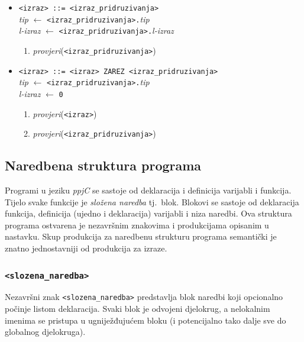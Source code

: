 \documentclass[times, 12pt, utf8]{book}
\begin{document}
\begin{itemize}

\item
\verb|<izraz> ::= <izraz_pridruzivanja>|\\
\emph{tip} \(\leftarrow\) \verb|<izraz_pridruzivanja>.|\emph{tip}\\
\emph{l-izraz} \(\leftarrow\) \verb|<izraz_pridruzivanja>.|\emph{l-izraz}
\begin{enumerate}
\item
\emph{provjeri}(\verb|<izraz_pridruzivanja>|)
\end{enumerate}

\item
\verb#<izraz> ::= <izraz> ZAREZ <izraz_pridruzivanja>#\\
\emph{tip} \(\leftarrow\) \verb|<izraz_pridruzivanja>.|\emph{tip}\\
\emph{l-izraz} \(\leftarrow\) \verb|0|
\begin{enumerate}
\item
\emph{provjeri}(\verb|<izraz>|)
\item
\emph{provjeri}(\verb|<izraz_pridruzivanja>|)
\end{enumerate}

\end{itemize}

\subsection{Naredbena struktura programa}
Programi u jeziku \emph{ppjC} se sastoje od deklaracija i definicija varijabli i funkcija.
Tijelo svake funkcije je \emph{složena naredba} tj.~blok.
Blokovi se sastoje od deklaracija funkcija, definicija (ujedno i deklaracija) varijabli i niza naredbi.
Ova struktura programa ostvarena je nezavršnim znakovima i produkcijama opisanim u nastavku.
Skup produkcija za naredbenu strukturu programa semantički je znatno jednostavniji od produkcija za izraze.

\subsubsection{\texttt{<slozena\_naredba>}}

Nezavršni znak \verb|<slozena_naredba>| predstavlja blok naredbi koji opcionalno počinje listom deklaracija.
Svaki blok je odvojeni djelokrug, a nelokalnim imenima se pristupa u ugniježđujućem bloku (i potencijalno tako dalje sve do globalnog djelokruga).
\end{document}
